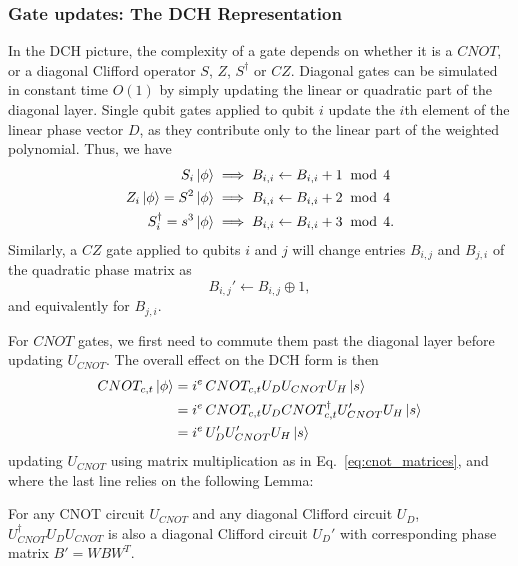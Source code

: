 \subsubsection*{Gate updates: The DCH Representation}
In the DCH picture, the complexity of a gate depends on whether it is a $CNOT$, or a diagonal Clifford operator $S$, $Z$, $S^{\dagger}$ or $CZ$. Diagonal gates can be simulated in constant time $O(1)$ by simply updating the linear or quadratic part of the diagonal layer. Single qubit gates applied to qubit $i$ update the $i$th element of the linear phase vector $D$, as they contribute only to the linear part of the weighted polynomial. Thus, we have
\begin{align}
S_{i}\ket{\phi} &\implies B_{i,i}\leftarrow B_{i,i} + 1\;\bmod\,4 \\
Z_{i}\ket{\phi} = S^{2}\ket{\phi} &\implies B_{i,i}\leftarrow B_{i,i} +2\;\bmod\,4 \\
S_{i}^{\dagger} = s^{3}\ket{\phi} & \implies B_{i,i}\leftarrow B_{i,i} + 3\;\bmod\,4. 
\end{align}
Similarly, a $CZ$ gate applied to qubits $i$ and $j$ will change entries $B_{i,j}$ and $B_{j,i}$ of the quadratic phase matrix as
\begin{equation}
B_{i,j}' \leftarrow B_{i,j}\oplus 1,
\end{equation}
and equivalently for $B_{j,i}$.\par
For $CNOT$ gates, we first need to commute them past the diagonal layer before updating $U_{CNOT}$. The overall effect on the DCH form is then
\begin{align}
CNOT_{c,t}\ket{\phi} &= i^{e}\,CNOT_{c,t}U_{D}U_{CNOT}U_{H} \ket{s}\nonumber \\
&= i^{e}\,CNOT_{c,t}U_{D}CNOT_{c,t}^{\dagger} U_{CNOT}' U_{H}\ket{s} \nonumber \\
&= i^{e}\,U_{D}'U_{CNOT}'U_{H}\ket{s}
\end{align}
updating $U_{CNOT}$ using matrix multiplication as in Eq.~\ref{eq:cnot_matrices}, and where the last line relies on the following Lemma:
\begin{lem}
For any CNOT circuit $U_{CNOT}$ and any diagonal Clifford circuit $U_{D}$, $U_{CNOT}^{\dagger}U_{D}U_{CNOT}$ is also a diagonal Clifford circuit $U_{D}'$ with corresponding phase matrix $B'=WBW^{T}$.\label{lem:dc_conjugtation}
\end{lem}
